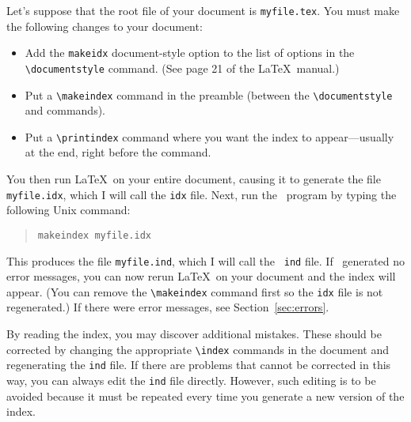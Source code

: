 Let's suppose that the root file of your document is {\tt myfile.tex}.
You must make the following changes to your document:
\begin{itemize}

\item Add the {\tt makeidx}%
document-style option to the list of
options in the \verb|\documentstyle| command.  (See page 21 of the
\LaTeX\ manual.)%

\item Put a \verb|\makeindex| command in the preamble (between the
  \linebreak%
\verb|\documentstyle| and \verb|| commands).

\item Put a \verb|\printindex| command%
where you want the index to
appear---usually at the end, right before the \verb||
command.
\end{itemize}
You then run \LaTeX\ on your entire document, causing it to
generate the file {\tt myfile.idx}, which I will call the
{\tt idx}%
file.
Next, run the \MakeIndex\ program by
typing the following Unix command:
\begin{quote}
    {\tt makeindex myfile.idx}
\end{quote}
This produces the file {\tt myfile.ind}, which I will call the {\tt
ind}%
file.  If \MakeIndex\ generated no error messages, you can now rerun
\LaTeX\ on your document and the index will appear.  (You can remove
the \verb|\makeindex|%
command first so the
{\tt idx}%
file is not
regenerated.)  If there were error messages,%
see
Section~\ref{sec:errors}.

By reading the index, you may discover additional
mistakes.%
These should be
corrected by changing the appropriate \verb|\index| commands in the
document and regenerating the {\tt ind} file.  If there are
problems that cannot be corrected in this way, you can always edit
the {\tt ind} file directly.  However, such
editing%
is to be
avoided because it must be repeated every time you generate a new
version of the index.


